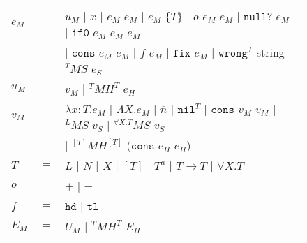 \begin{figure}[p]
\centering
\begin{tabular}{lcl}
\vspace{5pt}

$e_{M}$ & $=$ & $u_{M}$ $\vert$ $x$ $\vert$ $e_{M}$ $e_{M}$ $\vert$ $e_{M}$ $\lbrace T\rbrace$ $\vert$ $o$ $e_{M}$ $e_{M}$ $\vert$ $\mathtt{null?}$ $e_{M}$ $\vert$ $\mathtt{if0}$ $e_{M}$ $e_{M}$ $e_{M}$ \\

\vspace{5pt}

&& $\vert$ $\mathtt{cons}$ $e_{M}$ $e_{M}$ $\vert$ $f$ $e_{M}$ $\vert$ $\mathtt{fix}$ $e_{M}$ $\vert$ $\mathtt{wrong}^{T}$ string $\vert$ $^{T}MS$ $e_{S}$ \\

\vspace{5pt}

$u_{M}$ & $=$ & $v_{M}$ $\vert$ $^{T}MH^{T}$ $e_{H}$ \\

\vspace{5pt}

$v_{M}$ & $=$ & $\lambda x:T.e_{M}$ $\vert$ $\Lambda X.e_{M}$ $\vert$ $\overline{n}$ $\vert$ $\mathtt{nil}^{T}$ $\vert$ $\mathtt{cons}$ $v_{M}$ $v_{M}$ $\vert$ $^{L}MS$ $v_{S}$ $\vert$ $^{\forall X.T}MS$ $v_{S}$ \\

\vspace{5pt}

&& $\vert$ $^{[T]}MH^{[T]}$ $(\mathtt{cons}$ $e_{H}$ $e_{H})$ \\

\vspace{5pt}

$T$ & $=$ & $L$ $\vert$ $N$ $\vert$ $X$ $\vert$ $[T]$ $\vert$ $T^{a}$ $\vert$ $T\rightarrow T$ $\vert$ $\forall X.T$ \\

\vspace{5pt}

$o$ & $=$ & $+$ $\vert$ $-$ \\

\vspace{5pt}

$f$ & $=$ & $\mathtt{hd}$ $\vert$ $\mathtt{tl}$ \\

\vspace{5pt}

$E_{M}$ & $=$ & $U_{M}$ $\vert$ $^{T}MH^{T}$ $E_{H}$ \\


\end{tabular}
\end{figure}
